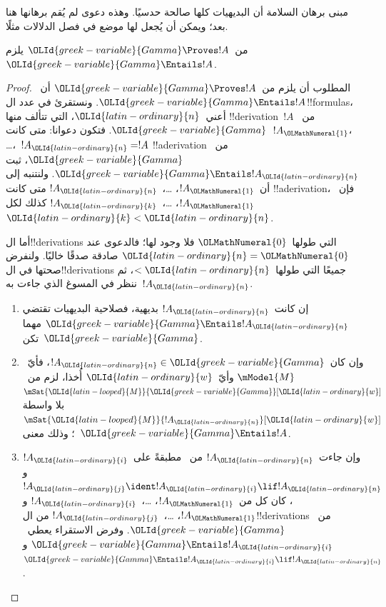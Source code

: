 \documentclass[../../../include/open-logic-section]{subfiles}
\begin{document}


\begin{editorial}
  مبنى برهان السلامة أن البديهيات كلها صالحة حدسيًا. وهذه دعوى لم يُقم
  برهانها هنا بعد؛ ويمكن أن يُجعل لها موضع في فصل الدلالات مثلًا.
\end{editorial}

\begin{thm}[السلامة]
  من~$\OLId{greek-variable}{Gamma} \Proves !A$ يلزم~$\OLId{greek-variable}{Gamma} \Entails !A$.
\end{thm}

\begin{proof}
  المطلوب أن يلزم من~$\OLId{greek-variable}{Gamma} \Proves !A$ أن~$\OLId{greek-variable}{Gamma} \Entails !A$.
  ونستقرئ في عدد ال!!{formula}s، أعني~$\OLId{latin-ordinary}{n}$، التي تتألف منها
  !!{derivation}~$!A$ من~$\OLId{greek-variable}{Gamma}$. فتكون دعوانا: متى كانت~$!A_\OLMathNumeral{1}$،
  \dots،~$!A_\OLId{latin-ordinary}{n}=!A$ !!a{derivation} من~$\OLId{greek-variable}{Gamma}$، ثبت
  $\OLId{greek-variable}{Gamma} \Entails !A_\OLId{latin-ordinary}{n}$. ولنتنبه إلى أن~$!A_\OLMathNumeral{1}$، \dots،~$!A_\OLId{latin-ordinary}{n}$
  متى كانت !!a{derivation}، فإن~$!A_\OLMathNumeral{1}$، \dots،~$!A_\OLId{latin-ordinary}{k}$ كذلك لكل~$\OLId{latin-ordinary}{k}<\OLId{latin-ordinary}{n}$.

  أما ال!!{derivation}s التي طولها~$\OLMathNumeral{0}$ فلا وجود لها؛ فالدعوى عند
  $\OLId{latin-ordinary}{n}=\OLMathNumeral{0}$ صادقة صدقًا خاليًا. ولنفرض صحتها في ال!!{derivation}s جميعًا
  التي طولها~$<\OLId{latin-ordinary}{n}$، ثم ننظر في المسوغ الذي جاءت به~$!A_\OLId{latin-ordinary}{n}$.

  \begin{enumerate}
  \item إن كانت~$!A_\OLId{latin-ordinary}{n}$ بديهية، فصلاحية البديهيات تقتضي
    $\OLId{greek-variable}{Gamma} \Entails !A_\OLId{latin-ordinary}{n}$ مهما تكن~$\OLId{greek-variable}{Gamma}$.
  \item وإن كان~$!A_\OLId{latin-ordinary}{n} \in \OLId{greek-variable}{Gamma}$، فأيّ~$\mModel{M}$ وأيّ~$\OLId{latin-ordinary}{w}$ أُخذا،
    لزم من~$\mSat{\OLId{latin-looped}{M}}{\OLId{greek-variable}{Gamma}}[\OLId{latin-ordinary}{w}]$ بلا واسطة
    $\mSat{\OLId{latin-looped}{M}}{!A_\OLId{latin-ordinary}{n}}[\OLId{latin-ordinary}{w}]$؛ وذلك معنى~$\OLId{greek-variable}{Gamma} \Entails !A$.
  \item وإن جاءت~$!A_\OLId{latin-ordinary}{n}$ من~\MP{} مطبقةً على~$!A_\OLId{latin-ordinary}{i}$ و
    $!A_\OLId{latin-ordinary}{j} \ident !A_\OLId{latin-ordinary}{i} \lif !A_\OLId{latin-ordinary}{n}$، كان كل من~$!A_\OLMathNumeral{1}$، \dots،~$!A_\OLId{latin-ordinary}{i}$ و
    $!A_\OLMathNumeral{1}$، \dots،~$!A_\OLId{latin-ordinary}{j}$ من ال!!{derivation}s من~$\OLId{greek-variable}{Gamma}$. وفرض
    الاستقراء يعطي~$\OLId{greek-variable}{Gamma} \Entails !A_\OLId{latin-ordinary}{i}$ و
    $\OLId{greek-variable}{Gamma} \Entails !A_\OLId{latin-ordinary}{i} \lif !A_\OLId{latin-ordinary}{n}$.


\end{enumerate}
\end{proof}
\end{document}
